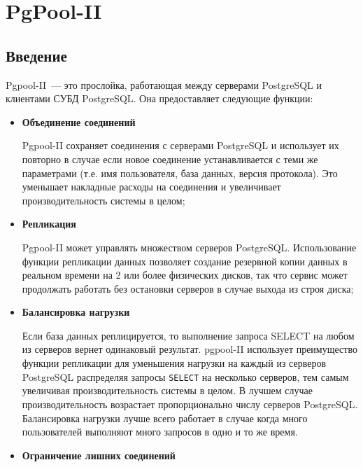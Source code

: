 \chapter{PgPool-II}

\begin{epigraphs}
\end{epigraphs}

\section{Введение}

Pgpool-II~--- это прослойка, работающая между серверами PostgreSQL и клиентами СУБД PostgreSQL. Она предоставляет следующие функции:

\begin{itemize}

\item \textbf{Объединение соединений}

Pgpool-II сохраняет соединения с серверами PostgreSQL и использует их повторно в случае если новое соединение устанавливается с теми же параметрами (т.е. имя пользователя, база данных, версия протокола). Это уменьшает накладные расходы на соединения и увеличивает производительность системы в целом;

\item \textbf{Репликация}

Pgpool-II может управлять множеством серверов PostgreSQL. Использование функции репликации данных позволяет создание резервной копии данных в реальном времени на  2 или более физических дисков, так что сервис может продолжать работать без остановки серверов в случае выхода из строя диска;

\item \textbf{Балансировка нагрузки}

Если база данных реплицируется, то выполнение запроса SELECT на любом из серверов вернет одинаковый результат. pgpool-II использует преимущество функции репликации для уменьшения нагрузки на каждый из серверов PostgreSQL распределяя запросы \lstinline!SELECT! на несколько серверов, тем самым увеличивая производительность системы в целом. В лучшем случае производительность возрастает пропорционально числу серверов PostgreSQL. Балансировка нагрузки лучше всего работает в случае когда много пользователей выполняют много запросов в одно и то же время.

\item \textbf{Ограничение лишних соединений}


\end{itemize}
